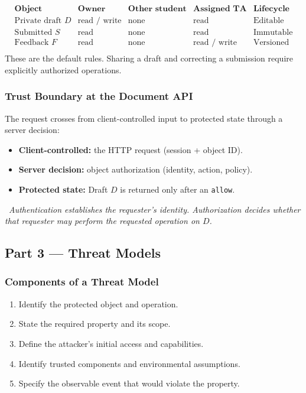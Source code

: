 \documentclass[hidelinks]{article}
\newcommand{\callout}[1]{\par\smallskip\noindent{\color{capri}$\blacktriangleright$}\ \textit{#1}\par\smallskip}
\begin{document}
\[
\begin{array}{lllll}
\textbf{Object} & \textbf{Owner} & \textbf{Other student} & \textbf{Assigned TA} & \textbf{Lifecycle}\\ \hline
\text{Private draft } D & \text{read / write} & \text{none} & \text{read} & \text{Editable}\\
\text{Submitted } S     & \text{read}        & \text{none} & \text{read} & \text{Immutable}\\
\text{Feedback } F      & \text{read}        & \text{none} & \text{read / write} & \text{Versioned}\\
\end{array}
\]
These are the default rules. Sharing a draft and correcting a submission require explicitly authorized operations.

\subsubsection{Trust Boundary at the Document API}

The request crosses from client-controlled input to protected state through a server decision:
\begin{itemize}
    \item \textbf{Client-controlled:} the HTTP request (session + object ID).
    \item \textbf{Server decision:} object authorization (identity, action, policy).
    \item \textbf{Protected state:} Draft $D$ is returned only after an \texttt{allow}.
\end{itemize}

\callout{Authentication establishes the requester's identity. Authorization decides whether that requester may perform the requested operation on $D$.}

\subsection{Part 3 --- Threat Models}

\subsubsection{Components of a Threat Model}

\begin{enumerate}
    \item Identify the protected object and operation.
    \item State the required property and its scope.
    \item Define the attacker's initial access and capabilities.
    \item Identify trusted components and environmental assumptions.
    \item Specify the observable event that would violate the property.
\end{enumerate}
\end{document}
